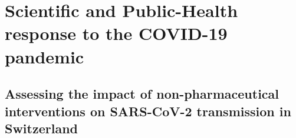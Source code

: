 \documentclass[nohyper,nobib,a4]{tufte-book}
\begin{document}


\part{Scientific and Public-Health response to the COVID-19 pandemic}

\chapter{Assessing the impact of non-pharmaceutical interventions on SARS-CoV-2 transmission in Switzerland}
\label{ch:covid-switzerland-npi}

%



\backmatter

% 
% 


\printindex
\end{document}
